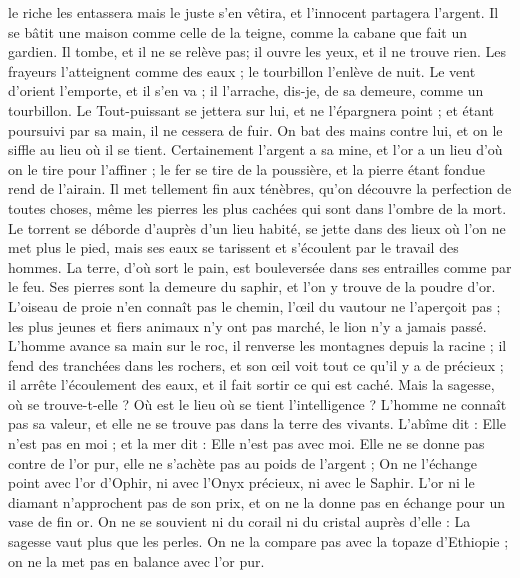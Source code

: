 \begin{multicols}{2}
le riche les entassera mais le juste s'en vêtira, et l'innocent partagera l'argent.
Il se bâtit une maison comme celle de la teigne, comme la cabane que fait un gardien.
Il tombe, et il ne se relève pas; il ouvre les yeux, et il ne trouve rien.
Les frayeurs l'atteignent comme des eaux ; le tourbillon l'enlève de nuit.
Le vent d'orient l'emporte, et il s'en va ; il l'arrache, dis-je, de sa demeure, comme un tourbillon.
 Le Tout-puissant se jettera sur lui, et ne l'épargnera point ; et étant poursuivi par sa main, il ne cessera de fuir.
On bat des mains contre lui, et on le siffle au lieu où il se tient.
\VerseOne{}Certainement l'argent a sa mine, et l'or a un lieu d'où on le tire pour l'affiner ;
le fer se tire de la poussière, et la pierre étant fondue rend de l'airain.
Il met tellement fin aux ténèbres, qu'on découvre la perfection de toutes choses, même les pierres les plus cachées qui sont dans l'ombre de la mort.
Le torrent se déborde d'auprès d'un lieu habité, se jette dans des lieux où l'on ne met plus le pied, mais ses eaux se tarissent et s'écoulent par le travail des hommes.
La terre, d'où sort le pain, est bouleversée dans ses entrailles comme par le feu.
Ses pierres sont la demeure du saphir, et l'on y trouve de la poudre d'or.
L'oiseau de proie n'en connaît pas le chemin, l'œil du vautour ne l'aperçoit pas ;
les plus jeunes et fiers animaux n'y ont pas marché, le lion n'y a jamais passé.
L'homme avance sa main sur le roc, il renverse les montagnes depuis la racine ;
il fend des tranchées dans les rochers, et son œil voit tout ce qu'il y a de précieux ;
il arrête l'écoulement des eaux, et il fait sortir ce qui est caché.
Mais la sagesse, où se trouve-t-elle ? Où est le lieu où se tient l'intelligence ?
L'homme ne connaît pas sa valeur, et elle ne se trouve pas dans la terre des vivants.
L'abîme dit : Elle n'est pas en moi ; et la mer dit : Elle n'est pas avec moi.
Elle ne se donne pas contre de l'or pur, elle ne s'achète pas au poids de l'argent ;
On ne l'échange point avec l'or d'Ophir, ni avec l'Onyx précieux, ni avec le Saphir.
L'or ni le diamant n'approchent pas de son prix, et on ne la donne pas en échange pour un vase de fin or.
On ne se souvient ni du corail ni du cristal auprès d'elle : La sagesse vaut plus que les perles.
On ne la compare pas avec la topaze d'Ethiopie ; on ne la met pas en balance avec l'or pur.

\end{multicols}
